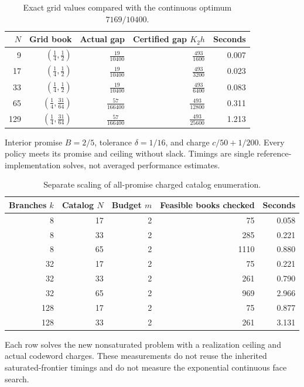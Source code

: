\begin{table}[p]\centering\small
\caption{Exact grid values compared with the continuous optimum $7169/10400$.}\label{tab:r42-mesh}
\begin{tabular}{rrrrr}\toprule
$N$ & Grid book & Actual gap & Certified gap $K_2h$ & Seconds\\\midrule
9 & $(\frac{1}{4},\frac{1}{2})$ & $\frac{19}{10400}$ & $\frac{493}{1600}$ & 0.007\\[3pt]
17 & $(\frac{1}{4},\frac{1}{2})$ & $\frac{19}{10400}$ & $\frac{493}{3200}$ & 0.023\\[3pt]
33 & $(\frac{1}{4},\frac{1}{2})$ & $\frac{19}{10400}$ & $\frac{493}{6400}$ & 0.083\\[3pt]
65 & $(\frac{1}{4},\frac{31}{64})$ & $\frac{57}{166400}$ & $\frac{493}{12800}$ & 0.311\\[3pt]
129 & $(\frac{1}{4},\frac{31}{64})$ & $\frac{57}{166400}$ & $\frac{493}{25600}$ & 1.213\\[3pt]
\bottomrule\end{tabular}
\par\smallskip\begin{minipage}{.96\textwidth}\footnotesize Interior promise $B=2/5$, tolerance $\delta=1/16$, and charge $c/50+1/200$. Every policy meets its promise and ceiling without slack. Timings are single reference-implementation solves, not averaged performance estimates.\end{minipage}
\end{table}\clearpage
\begin{table}[p]\centering\small
\caption{Separate scaling of all-promise charged catalog enumeration.}\label{tab:r42-scaling}
\begin{tabular}{rrrrr}\toprule
Branches $k$ & Catalog $N$ & Budget $m$ & Feasible books checked & Seconds\\\midrule
8 & 17 & 2 & 75 & 0.058\\
8 & 33 & 2 & 285 & 0.221\\
8 & 65 & 2 & 1110 & 0.880\\
32 & 17 & 2 & 75 & 0.221\\
32 & 33 & 2 & 261 & 0.790\\
32 & 65 & 2 & 969 & 2.966\\
128 & 17 & 2 & 75 & 0.877\\
128 & 33 & 2 & 261 & 3.131\\
\bottomrule\end{tabular}
\par\smallskip\begin{minipage}{.96\textwidth}\footnotesize Each row solves the new nonsaturated problem with a realization ceiling and actual codeword charges. These measurements do not reuse the inherited saturated-frontier timings and do not measure the exponential continuous face search.\end{minipage}
\end{table}\clearpage
